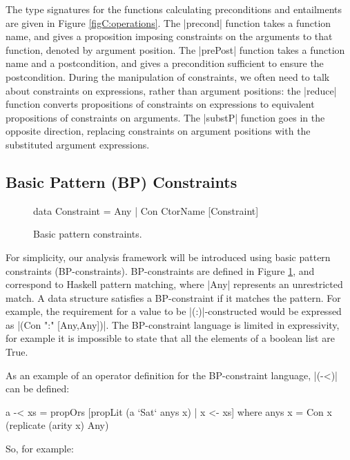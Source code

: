 The type signatures for the functions calculating preconditions and entailments are given in Figure \ref{figC:operations}. The |precond| function takes a function name, and gives a proposition imposing constraints on the arguments to that function, denoted by argument position. The |prePost| function takes a function name and a postcondition, and gives a precondition sufficient to ensure the postcondition. During the manipulation of constraints, we often need to talk about constraints on expressions, rather than argument positions: the |reduce| function converts propositions of constraints on expressions to equivalent propositions of constraints on arguments. The |substP| function goes in the opposite direction, replacing constraints on argument positions with the substituted argument expressions.

\subsection{Basic Pattern (BP) Constraints}
\label{secC:basic}

\begin{figure}
\begin{code}
data Constraint  =  Any
                 |  Con CtorName [Constraint]
\end{code}
\caption{Basic pattern constraints.}
\label{figC:basic}
\end{figure}

For simplicity, our analysis framework will be introduced using basic pattern constraints (BP-constraints). BP-constraints are defined in Figure \ref{figC:basic}, and correspond to Haskell pattern matching, where |Any| represents an unrestricted match. A data structure satisfies a BP-constraint if it matches the pattern. For example, the requirement for a value to be |(:)|-constructed would be expressed as |(Con ":" [Any,Any])|. The BP-constraint language is limited in expressivity, for example it is impossible to state that all the elements of a boolean list are True.

As an example of an operator definition for the BP-constraint language, |(-<)| can be defined:

\begin{code}
a -< xs = propOrs [propLit (a `Sat` anys x) | x <- xs]
    where anys x = Con x (replicate (arity x) Any)
\end{code}

\noindent So, for example:

